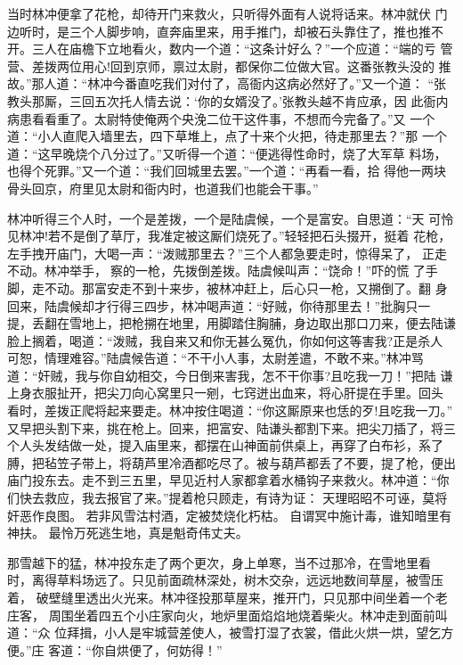 当时林冲便拿了花枪，却待开门来救火，只听得外面有人说将话来。林冲就伏
门边听时，是三个人脚步响，直奔庙里来，用手推门，却被石头靠住了，推也推不
开。三人在庙檐下立地看火，数内一个道：“这条计好么？”一个应道：“端的亏
管营、差拨两位用心!回到京师，禀过太尉，都保你二位做大官。这番张教头没的
推故。”那人道：“林冲今番直吃我们对付了，高衙内这病必然好了。”又一个道：
“张教头那厮，三回五次托人情去说：‘你的女婿没了。’张教头越不肯应承，因
此衙内病患看看重了。太尉特使俺两个央浼二位干这件事，不想而今完备了。”又
一个道：“小人直爬入墙里去，四下草堆上，点了十来个火把，待走那里去？”那
一个道：“这早晚烧个八分过了。”又听得一个道：“便逃得性命时，烧了大军草
料场，也得个死罪。”又一个道：“我们回城里去罢。”一个道：“再看一看，拾
得他一两块骨头回京，府里见太尉和衙内时，也道我们也能会干事。”

林冲听得三个人时，一个是差拨，一个是陆虞候，一个是富安。自思道：“天
可怜见林冲!若不是倒了草厅，我准定被这厮们烧死了。”轻轻把石头掇开，挺着
花枪，左手拽开庙门，大喝一声：“泼贼那里去？”三个人都急要走时，惊得呆了，
正走不动。林冲举手，察的一枪，先拨倒差拨。陆虞候叫声：“饶命！”吓的慌
了手脚，走不动。那富安走不到十来步，被林冲赶上，后心只一枪，又搠倒了。翻
身回来，陆虞候却才行得三四步，林冲喝声道：“好贼，你待那里去！”批胸只一
提，丢翻在雪地上，把枪搠在地里，用脚踏住胸脯，身边取出那口刀来，便去陆谦
脸上搁着，喝道：“泼贼，我自来又和你无甚么冤仇，你如何这等害我?正是杀人
可恕，情理难容。”陆虞候告道：“不干小人事，太尉差遣，不敢不来。”林冲骂
道：“奸贼，我与你自幼相交，今日倒来害我，怎不干你事?且吃我一刀！”把陆
谦上身衣服扯开，把尖刀向心窝里只一剜，七窍迸出血来，将心肝提在手里。回头
看时，差拨正爬将起来要走。林冲按住喝道：“你这厮原来也恁的歹!且吃我一刀。”
又早把头割下来，挑在枪上。回来，把富安、陆谦头都割下来。把尖刀插了，将三
个人头发结做一处，提入庙里来，都摆在山神面前供桌上，再穿了白布衫，系了
膊，把毡笠子带上，将葫芦里冷酒都吃尽了。被与葫芦都丢了不要，提了枪，便出
庙门投东去。走不到三五里，早见近村人家都拿着水桶钩子来救火。林冲道：“你
们快去救应，我去报官了来。”提着枪只顾走，有诗为证：
天理昭昭不可诬，莫将奸恶作良图。
若非风雪沽村酒，定被焚烧化朽枯。
自谓冥中施计毒，谁知暗里有神扶。
最怜万死逃生地，真是魁奇伟丈夫。

那雪越下的猛，林冲投东走了两个更次，身上单寒，当不过那冷，在雪地里看
时，离得草料场远了。只见前面疏林深处，树木交杂，远远地数间草屋，被雪压着，
破壁缝里透出火光来。林冲径投那草屋来，推开门，只见那中间坐着一个老庄客，
周围坐着四五个小庄家向火，地炉里面焰焰地烧着柴火。林冲走到面前叫道：“众
位拜揖，小人是牢城营差使人，被雪打湿了衣裳，借此火烘一烘，望乞方便。”庄
客道：“你自烘便了，何妨得！”

